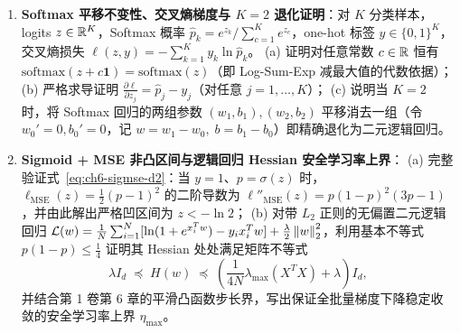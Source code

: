 \begin{enumerate}[label=\textbf{6.\arabic*}, resume]
  \item \textbf{Softmax 平移不变性、交叉熵梯度与 $K=2$ 退化证明}：对 $K$ 分类样本，logits $z \in \mathbb{R}^K$，Softmax 概率 $\hat{p}_k = e^{z_k} / \sum_{c=1}^K e^{z_c}$，one-hot 标签 $y \in \{0,1\}^K$，交叉熵损失 $\ell(z, y) = -\sum_{k=1}^K y_k \ln \hat{p}_k$。
  (a) 证明对任意常数 $c \in \mathbb{R}$ 恒有 $\mathrm{softmax}(z + c\mathbf{1}) = \mathrm{softmax}(z)$（即 Log-Sum-Exp 减最大值的代数依据）；
  (b) 严格求导证明 $\frac{\partial \ell}{\partial z_j} = \hat{p}_j - y_j$（对任意 $j=1,\dots,K$）；
  (c) 说明当 $K=2$ 时，将 Softmax 回归的两组参数 $(w_1, b_1), (w_2, b_2)$ 平移消去一组（令 $w_0' = 0, b_0' = 0$，记 $w = w_1 - w_0,\; b = b_1 - b_0$）即精确退化为二元逻辑回归。

  \item \textbf{Sigmoid + MSE 非凸区间与逻辑回归 Hessian 安全学习率上界}：
  (a) 完整验证式~\eqref{eq:ch6-sigmse-d2}：当 $y=1$、$p=\sigma(z)$ 时，$\ell_{\text{MSE}}(z) = \frac{1}{2}(p-1)^2$ 的二阶导数为 $\ell''_{\text{MSE}}(z) = p(1-p)^2(3p-1)$，并由此解出严格凹区间为 $z < -\ln 2$；
  (b) 对带 $L_2$ 正则的无偏置二元逻辑回归 $\mathcal{L}(w) = \frac{1}{N}\sum_{i=1}^N [\ln(1+e^{x_i^T w}) - y_i x_i^T w] + \frac{\lambda}{2}\left\|w\right\|_2^2$，利用基本不等式 $p(1-p) \le \frac{1}{4}$ 证明其 Hessian 处处满足矩阵不等式
  \[
    \lambda I_d \;\preceq\; H(w) \;\preceq\; \left(\frac{1}{4N}\lambda_{\max}(X^T X) + \lambda\right) I_d,
  \]
  并结合第 1 卷第 6 章的平滑凸函数步长界，写出保证全批量梯度下降稳定收敛的安全学习率上界 $\eta_{\max}$。
\end{enumerate}


